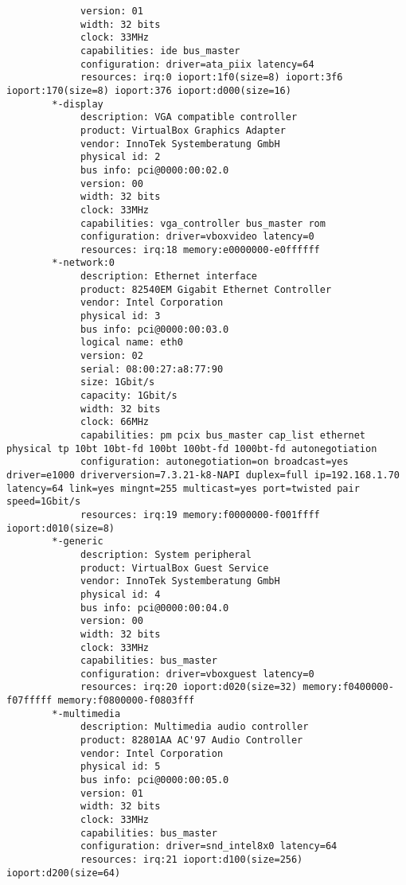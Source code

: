 {\begin{verbatim}
             version: 01
             width: 32 bits
             clock: 33MHz
             capabilities: ide bus_master
             configuration: driver=ata_piix latency=64
             resources: irq:0 ioport:1f0(size=8) ioport:3f6 ioport:170(size=8) ioport:376 ioport:d000(size=16)
        *-display
             description: VGA compatible controller
             product: VirtualBox Graphics Adapter
             vendor: InnoTek Systemberatung GmbH
             physical id: 2
             bus info: pci@0000:00:02.0
             version: 00
             width: 32 bits
             clock: 33MHz
             capabilities: vga_controller bus_master rom
             configuration: driver=vboxvideo latency=0
             resources: irq:18 memory:e0000000-e0ffffff
        *-network:0
             description: Ethernet interface
             product: 82540EM Gigabit Ethernet Controller
             vendor: Intel Corporation
             physical id: 3
             bus info: pci@0000:00:03.0
             logical name: eth0
             version: 02
             serial: 08:00:27:a8:77:90
             size: 1Gbit/s
             capacity: 1Gbit/s
             width: 32 bits
             clock: 66MHz
             capabilities: pm pcix bus_master cap_list ethernet physical tp 10bt 10bt-fd 100bt 100bt-fd 1000bt-fd autonegotiation
             configuration: autonegotiation=on broadcast=yes driver=e1000 driverversion=7.3.21-k8-NAPI duplex=full ip=192.168.1.70 latency=64 link=yes mingnt=255 multicast=yes port=twisted pair speed=1Gbit/s
             resources: irq:19 memory:f0000000-f001ffff ioport:d010(size=8)
        *-generic
             description: System peripheral
             product: VirtualBox Guest Service
             vendor: InnoTek Systemberatung GmbH
             physical id: 4
             bus info: pci@0000:00:04.0
             version: 00
             width: 32 bits
             clock: 33MHz
             capabilities: bus_master
             configuration: driver=vboxguest latency=0
             resources: irq:20 ioport:d020(size=32) memory:f0400000-f07fffff memory:f0800000-f0803fff
        *-multimedia
             description: Multimedia audio controller
             product: 82801AA AC'97 Audio Controller
             vendor: Intel Corporation
             physical id: 5
             bus info: pci@0000:00:05.0
             version: 01
             width: 32 bits
             clock: 33MHz
             capabilities: bus_master
             configuration: driver=snd_intel8x0 latency=64
             resources: irq:21 ioport:d100(size=256) ioport:d200(size=64)

\end{verbatim}}
